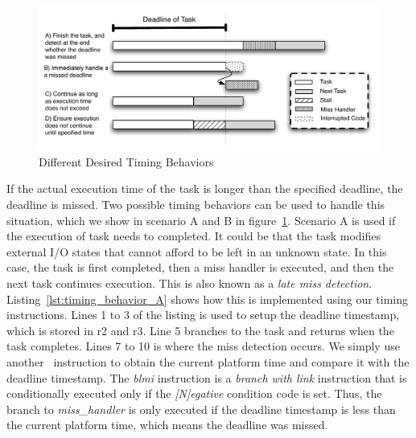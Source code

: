 \begin{figure}
  \vspace{-15pt}
  \begin{center}
    \includegraphics[scale=.7]{figs/timing_behaviors.pdf}
  \end{center}
  \vspace{-3mm}
  \caption{Different Desired Timing Behaviors}
  \label{fig:timing_behaviors}
\end{figure}

If the actual execution time of the task is longer than the specified deadline, the deadline is missed. 
Two possible timing behaviors can be used to handle this situation, which we show in scenario A and B in figure~\ref{fig:timing_behaviors}. 
Scenario A is used if the execution of task needs to completed. 
It could be that the task modifies external I/O states that cannot afford to be left in an unknown state.
In this case, the task is first completed, then a miss handler is executed, and then the next task continues execution.
This is also known as a \emph{late miss detection}.  
Listing~\ref{lst:timing_behavior_A} shows how this is implemented using our timing instructions.
Lines 1 to 3 of the listing is used to setup the deadline timestamp, which is stored in r2 and r3.  
Line 5 branches to the task and returns when the task completes.
Lines 7 to 10 is where the miss detection occurs. 
We simply use another \gettime\ instruction to obtain the current platform time and compare it with the deadline timestamp.
The \emph{blmi} instruction is a \emph{branch with link} instruction that is conditionally executed only if the \emph{[N]egative} condition code is set.
Thus, the branch to \emph{miss\_handler} is only executed if the deadline timestamp is less than the current platform time, which means the deadline was missed.

